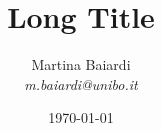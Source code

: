 \graphicspath{{images/}{./}} %

\usepackage{booktabs} %
\usepackage{xcolor}
\usepackage{listings}
\lstset{
    basicstyle=\ttfamily,
    language=make,
    columns=fullflexible,
    breaklines=true,
    showstringspaces=false,
}
\usepackage{hyperref}




\usepackage{amsmath}
\usepackage{palatino} %
\usepackage[default]{opensans}
\usepackage{textcomp} %



\title[Short Title]{Long Title}
\author[Martina Baiardi]{Martina Baiardi \\ \smallskip \textit{m.baiardi@unibo.it}}
\date[\today]{\today}
